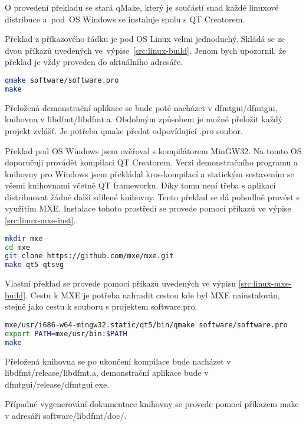 O provedení překladu se stará qMake, který je součástí snad každé linuxové distribuce a~pod~OS Windows se instaluje spolu s QT Creatorem.

Překlad z příkazového řádku je pod OS Linux velmi jednoduchý. Skládá se ze dvou příkazů uvedených ve~výpise~\ref{src:linux-build}. Jenom bych upozornil, že překlad je vždy proveden do aktuálního adresáře.

\begin{lstlisting}[language=bash, label=src:linux-build, caption=Překlad pod OS Linux z příkazové řádku.]
qmake software/software.pro
make
\end{lstlisting}

Přeložená demonstrační aplikace se bude poté nacházet v dfmtgui/dfmtgui, knihovna v libdfmt/libdfmt.a. Obdobným způsobem je možné přeložit každý projekt zvlášť. Je potřeba qmake předat odpovídající .pro soubor.

Překlad pod OS Windows jsem ověřoval s kompilátorem MinGW32. Na tomto OS doporučuji provádět kompilaci QT Creatorem. Verzi demonstračního programu a knihovny pro Windows jsem překládal kros-kompilací a statickým sestavením se všemi knihovnami včetně QT frameworku. Díky tomu není třeba s aplikací distribuovat žádné další sdílené knihovny. Tento překlad se dá pohodlně provést s využitím MXE. Instalace tohoto prostředí se provede pomocí příkazů ve výpise \ref{src:linux-mxe-inst}.

\begin{lstlisting}[language=bash, label=src:linux-mxe-inst, caption=Instalace MXE umožňující překlad pro Windows na Linuxu.]
mkdir mxe
cd mxe
git clone https://github.com/mxe/mxe.git
make qt5 qtsvg
\end{lstlisting}

Vlastní překlad se provede pomocí příkazů uvedených ve výpisu \ref{src:linux-mxe-build}. Cestu k MXE je potřeba nahradit cestou kde byl MXE nainstalován, stejně jako cestu k souboru s projektem software.pro.

\begin{lstlisting}[language=bash, label=src:linux-mxe-build, caption=Překlad pod OS Linux pro OS Windows.]
mxe/usr/i686-w64-mingw32.static/qt5/bin/qmake software/software.pro
export PATH=mxe/usr/bin:$PATH
make
\end{lstlisting}

Přeložená knihovna se po ukončení kompilace bude nacházet v libdfmt/release/libdfmt.a, demonstrační aplikace bude v dfmtgui/release/dfmtgui.exe.


Případné vygenerování dokumentace knihovny se provede pomocí příkazem make v adresáři software/libdfmt/doc/.